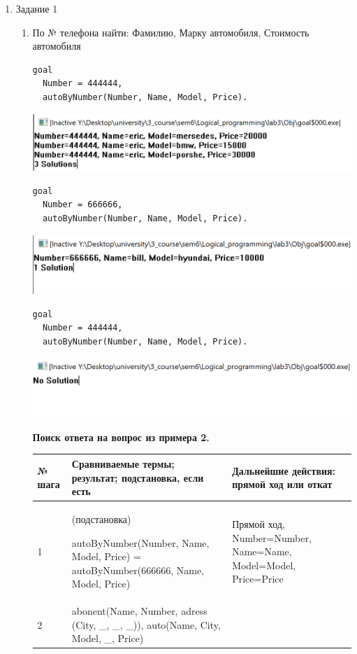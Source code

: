 \documentclass[a4paper,14pt]{extreport} %
\begin{document}
\begin{enumerate}
\item Задание 1
\begin{enumerate}
\item По № телефона найти: Фамилию, Марку автомобиля, Стоимость автомобиля


\begin{lstlisting}[caption=Пример 1 задание 1a]
goal
  Number = 444444,
  autoByNumber(Number, Name, Model, Price).
\end{lstlisting}

\includegraphics[scale=0.8]{ex1}

\begin{lstlisting}[caption=Пример 2 задание 1a]
goal
  Number = 666666,
  autoByNumber(Number, Name, Model, Price).
\end{lstlisting}

\includegraphics[scale=0.8]{ex2}


\begin{lstlisting}[caption=Пример 3 задание 1a]
goal
  Number = 444444,
  autoByNumber(Number, Name, Model, Price).
\end{lstlisting}

\includegraphics[scale=0.8]{ex3}

\textbf{Поиск ответа на вопрос из примера 2. }

\begin{longtable}{|p{1.1cm}|p{8.5cm}|p{7cm}|}
	\hline
 	№ шага & Сравниваемые термы; результат; подстановка, если есть  & Дальнейшие действия: прямой ход или откат \\ \hline
	1 & (подстановка)
	
	autoByNumber(Number, Name, Model, Price) = autoByNumber(666666, Name, Model, Price) & Прямой ход, Number=Number, Name=Name, Model=Model, Price=Price \\ \hline
	2 & abonent(Name, Number, adress (City, \_, \_, \_)), auto(Name, City, Model, \_, Price) 
	

\end{longtable}
\end{enumerate}
\end{enumerate}
\end{document}

